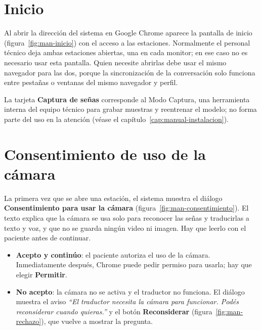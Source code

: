 \section{Inicio}

Al abrir la dirección del sistema en Google Chrome aparece la pantalla de inicio (figura~\ref{fig:man-inicio}) con el acceso a las estaciones. Normalmente el personal técnico deja ambas estaciones abiertas, una en cada monitor; en ese caso no es necesario usar esta pantalla. Quien necesite abrirlas debe usar el mismo navegador para las dos, porque la sincronización de la conversación solo funciona entre pestañas o ventanas del mismo navegador y perfil.


La tarjeta \textbf{Captura de señas} corresponde al Modo Captura, una herramienta interna del equipo técnico para grabar muestras y reentrenar el modelo; no forma parte del uso en la atención (véase el capítulo~\ref{cap:manual-instalacion}).

\section{Consentimiento de uso de la cámara}

La primera vez que se abre una estación, el sistema muestra el diálogo \textbf{Consentimiento para usar la cámara} (figura~\ref{fig:man-consentimiento}). El texto explica que la cámara se usa solo para reconocer las señas y traducirlas a texto y voz, y que no se guarda ningún video ni imagen. Hay que leerlo con el paciente antes de continuar.


\begin{itemize}
  \item \textbf{Acepto y continúo}: el paciente autoriza el uso de la cámara. Inmediatamente después, Chrome puede pedir permiso para usarla; hay que elegir \textbf{Permitir}.
  \item \textbf{No acepto}: la cámara no se activa y el traductor no funciona. El diálogo muestra el aviso \emph{``El traductor necesita la cámara para funcionar. Podés reconsiderar cuando quieras.''} y el botón \textbf{Reconsiderar} (figura~\ref{fig:man-rechazo}), que vuelve a mostrar la pregunta.
\end{itemize}

